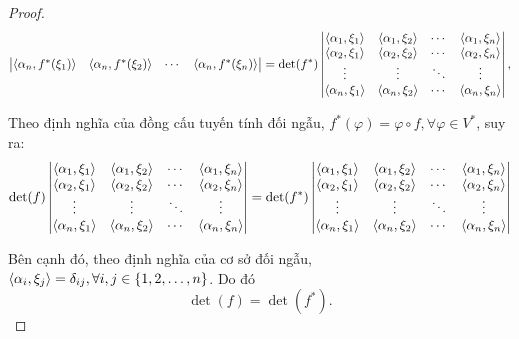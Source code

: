 \documentclass[class=linearalgebra,crop=false]{standalone}
\begin{document}
\begin{proof}
\begin{align*}
\begin{vmatrix}
            \left\langle{\alpha_{n},f^{*}(\xi_{1})}\right\rangle & \left\langle{\alpha_{n},f^{*}(\xi_{2})}\right\rangle & \cdots & \left\langle{\alpha_{n},f^{*}(\xi_{n})}\right\rangle \\
        \end{vmatrix}
         & = \det(f^{*})
        \begin{vmatrix}
            \left\langle{\alpha_{1},\xi_{1}}\right\rangle & \left\langle{\alpha_{1},\xi_{2}}\right\rangle & \cdots & \left\langle{\alpha_{1},\xi_{n}}\right\rangle \\
            \left\langle{\alpha_{2},\xi_{1}}\right\rangle & \left\langle{\alpha_{2},\xi_{2}}\right\rangle & \cdots & \left\langle{\alpha_{2},\xi_{n}}\right\rangle \\
            \vdots                       & \vdots                       & \ddots & \vdots                       \\
            \left\langle{\alpha_{n},\xi_{1}}\right\rangle & \left\langle{\alpha_{n},\xi_{2}}\right\rangle & \cdots & \left\langle{\alpha_{n},\xi_{n}}\right\rangle \\
        \end{vmatrix}, \\
    \end{align*}
    \par Theo định nghĩa của đồng cấu tuyến tính đối ngẫu, $f^{*}(\varphi) = \varphi\circ f, \forall\varphi\in V^{*}$, suy ra:
    \[
        \det(f)
        \begin{vmatrix}
            \left\langle{\alpha_{1},\xi_{1}}\right\rangle & \left\langle{\alpha_{1},\xi_{2}}\right\rangle & \cdots & \left\langle{\alpha_{1},\xi_{n}}\right\rangle \\
            \left\langle{\alpha_{2},\xi_{1}}\right\rangle & \left\langle{\alpha_{2},\xi_{2}}\right\rangle & \cdots & \left\langle{\alpha_{2},\xi_{n}}\right\rangle \\
            \vdots                       & \vdots                       & \ddots & \vdots                       \\
            \left\langle{\alpha_{n},\xi_{1}}\right\rangle & \left\langle{\alpha_{n},\xi_{2}}\right\rangle & \cdots & \left\langle{\alpha_{n},\xi_{n}}\right\rangle \\
        \end{vmatrix}
        =
        \det(f^{*})
        \begin{vmatrix}
            \left\langle{\alpha_{1},\xi_{1}}\right\rangle & \left\langle{\alpha_{1},\xi_{2}}\right\rangle & \cdots & \left\langle{\alpha_{1},\xi_{n}}\right\rangle \\
            \left\langle{\alpha_{2},\xi_{1}}\right\rangle & \left\langle{\alpha_{2},\xi_{2}}\right\rangle & \cdots & \left\langle{\alpha_{2},\xi_{n}}\right\rangle \\
            \vdots                       & \vdots                       & \ddots & \vdots                       \\
            \left\langle{\alpha_{n},\xi_{1}}\right\rangle & \left\langle{\alpha_{n},\xi_{2}}\right\rangle & \cdots & \left\langle{\alpha_{n},\xi_{n}}\right\rangle \\
        \end{vmatrix}
    \]
    \par Bên cạnh đó, theo định nghĩa của cơ sở đối ngẫu, $\left\langle{\alpha_{i}, \xi_{j}}\right\rangle = \delta_{ij}, \forall i, j\in \{ 1, 2, \ldots, n \}$. Do đó
    \[
        \det(f) = \det(f^{*}).
    \]
    \endgroup
\end{proof}
\end{document}
